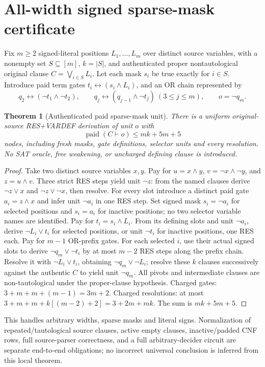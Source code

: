 \documentclass[11pt]{article}
\newtheorem{theorem}{Theorem}
\begin{document}
\section*{All-width signed sparse-mask certificate}
Fix \(m\ge2\) signed-literal positions \(L_1,\ldots,L_m\) over distinct source variables, with a nonempty set \(S\subseteq[m]\), \(k=|S|\), and authenticated proper nontautological original clause \(C=\bigvee_{i\in S} L_i\). Let each mask \(s_i\) be true exactly for \(i\in S\). Introduce paid term gates \(t_i\leftrightarrow(s_i\land L_i)\), and an OR chain represented by
\[
q_2\leftrightarrow(\neg t_1\land\neg t_2),\qquad
q_j\leftrightarrow(q_{j-1}\land\neg t_j)\ (3\le j\le m),\qquad
o=\neg q_m.
\]
\begin{theorem}[Authenticated paid sparse-mask unit]
There is a uniform original-source RES+VARDEF derivation of unit \(o\) with
\[
\boxed{\operatorname{paid}(C\vdash o)\le mk+5m+5}
\]
nodes, \emph{including} fresh masks, gate definitions, selector units and every resolution. No SAT oracle, free weakening, or uncharged defining clause is introduced.
\end{theorem}
\begin{proof}
Take two distinct source variables \(x,y\). Pay for \(u=x\wedge y\), \(v=\neg x\wedge\neg y\), and \(z=u\wedge v\). Three strict RES steps yield unit \(\neg z\): from the named clauses derive \(\neg z\vee x\) and \(\neg z\vee\neg x\), then resolve. For every slot introduce a distinct paid gate \(a_i=z\wedge x\) and infer unit \(\neg a_i\) in one RES step. Set signed mask \(s_i=\neg a_i\) for selected positions and \(s_i=a_i\) for inactive positions; no two selector variable names are identified. Pay for \(t_i=s_i\wedge L_i\). From its defining slots and unit \(\neg a_i\), derive \(\neg L_i\vee t_i\) for selected positions, or unit \(\neg t_i\) for inactive positions, one RES each. Pay for \(m-1\) OR-prefix gates. For each selected \(i\), use their actual signed slots to derive \(\neg q_m\vee\neg t_i\) by at most \(m-2\) RES steps along the prefix chain. Resolve it with \(\neg L_i\vee t_i\), obtaining \(\neg q_m\vee\neg L_i\); resolve these \(k\) clauses successively against the authentic \(C\) to yield unit \(\neg q_m\). All pivots and intermediate clauses are non-tautological under the proper-clause hypothesis. Charged gates: \(3+m+m+(m-1)=3m+2\). Charged resolutions: at most \(3+m+m+k[(m-2)+2]=3+2m+mk\). The sum is \(mk+5m+5\).
\end{proof}
\noindent This handles arbitrary widths, sparse masks and literal signs. Normalization of repeated/tautological source clauses, active empty clauses, inactive/padded CNF rows, full source-parser correctness, and a full arbitrary-decider circuit are separate end-to-end obligations; no incorrect universal conclusion is inferred from this local theorem.
\end{document}
